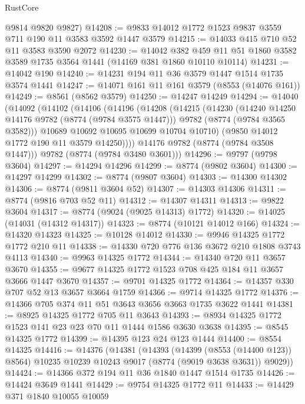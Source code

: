 \begin{lexlean}{RustCore}
\begin{coremodule}
      @9814
      @9820
      @9827)
@14208 := @9833 @14012 @1772 @1523 @9837 @3559 @711 @190 @11 @3583 @3592 @1447 @3579
@14215 := @14033 @415 @710 @52 @11 @3583 @3590 @2072
@14230 := @14042
    @382
    @459
    @11
    @51
    @1860
    @3582
    @3589
    @1735
    @3564
    @1441
    (@14169 @381 @1860 @10110 @10114)
@14231 := @14042 @190
@14240 := @14231 @194 @11 @36 @3579 @1447 @1514 @1735 @3574 @1441
@14247 := @14071 @161 @11 @161 @3579 (@8553 (@14076 @161))
@14249 := @8561 (@8562 @3579)
@14250 := @14247 @14249
@14294 := @14040
    (@14092
      (@14102
        (@14106
          (@14196
            (@14208
              (@14215
                (@14230
                  (@14240 @14250 @14176 @9782 (@8774 (@9784 @3575 @1447)))
                  @9782
                  (@8774 (@9784 @3565 @3582)))
                @10689
                @10692
                @10695
                @10699
                @10704
                @10710)
              (@9850 @14012 @1772 @190 @11 @3579 @14250))))
        @14176
        @9782
        (@8774 (@9784 @3508 @1447)))
      @9782
      (@8774 (@9784 @3480 @3601)))
@14296 := @9797 (@9798 @3604)
@14297 := @14294 @14296
@14299 := @8774 (@9802 @3604)
@14300 := @14297 @14299
@14302 := @8774 (@9807 @3604)
@14303 := @14300 @14302
@14306 := @8774 (@9811 @3604 @52)
@14307 := @14303 @14306
@14311 := @8774 (@9816 @703 @52 @11)
@14312 := @14307 @14311
@14313 := @9822 @3604
@14317 := @8774 (@9024 (@9025 @14313) @1772)
@14320 := @14025 (@14031 (@14312 @14317))
@14323 := @8774 (@10121 @14012 @166)
@14324 := @14320 @14323
@14325 := @10128 @14012
@14330 := @9946 @14325 @1772 @1772 @210 @11
@14338 := @14330 @720 @776 @136 @3672 @210 @1808 @3743 @4113
@14340 := @9963 @14325 @1772
@14344 := @14340 @720 @11 @3657 @3670
@14355 := @9677 @14325 @1772 @1523 @708 @425 @184 @11 @3657 @3666 @1447 @3670
@14357 := @9701 @14325 @1772
@14364 := @14357 @330 @707 @52 @13 @3657 @3664 @1759
@14366 := @9714 @14325 @1772
@14376 := @14366 @705 @374 @11 @51 @3643 @3656 @3663 @1735 @3622 @1441
@14381 := @8925 @14325 @1772 @705 @11 @3643
@14393 := @8934 @14325 @1772 @1523 @141 @23 @23 @70 @11 @1444 @1586 @3630 @3638
@14395 := @8545 @14325 @1772
@14399 := @14395 @123 @24 @123 @1444
@14400 := @8554 @14325
@14416 := @14376
    (@14381
      (@14393
        (@14399 (@8553 (@14400 @123)) @8564)
        @10235
        @10239
        @10243
        @9017
        (@8774 (@9019 @3638 @3631))
        @9029))
@14424 := @14366 @372 @194 @11 @36 @1840 @1447 @1514 @1735
@14426 := @14424 @3649 @1441
@14429 := @9754 @14325 @1772 @11
@14433 := @14429 @371 @1840 @10055 @10059

\end{coremodule}
\end{lexlean}
